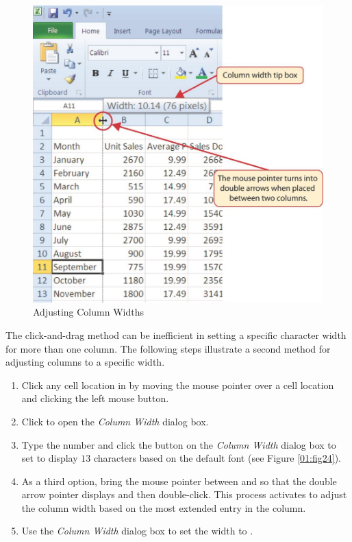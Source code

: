 \begin{figure}[H]
	\centering
	\includegraphics[width=\maxwidth{.95\linewidth}]{gfx/ch01_fig23}
	\caption{Adjusting Column Widths}
	\label{01:fig23}
\end{figure}

The click-and-drag method can be inefficient in setting a specific character width for more than one column. The following steps illustrate a second method for adjusting columns to a specific width.

\begin{enumbox}
	\begin{enumerate}
		\item Click any cell location in  by moving the mouse pointer over a cell location and clicking the left mouse button. 
		\item Click  to open the \textit{Column Width} dialog box.
		\item Type the number  and click the  button on the \textit{Column Width} dialog box to set  to display $ 13 $ characters based on the default font (see Figure \ref{01:fig24}).
		\item As a third option, bring the mouse pointer between  and  so that the double arrow pointer displays and then double-click. This process activates  to adjust the column width based on the most extended entry in the column.
		\item Use the \textit{Column Width} dialog box to set the width to .
	\end{enumerate}
\end{enumbox}
	
